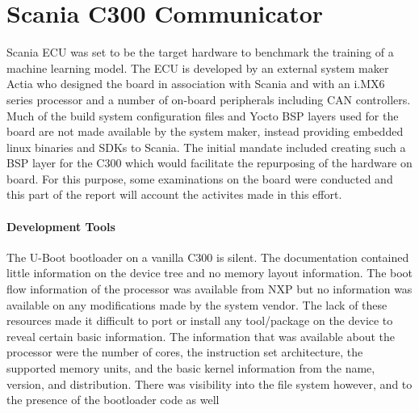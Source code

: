 \chapter{Scania C300 Communicator} \label{rtc-c300}

Scania ECU was set to be the target hardware to benchmark the training of a machine learning model. The ECU is developed by an external system maker Actia who designed the board in association with Scania and with an i.MX6 series processor and a number of on-board peripherals including CAN controllers. Much of the build system configuration files and Yocto BSP layers used for the board are not made available by the system maker, instead providing embedded linux binaries and SDKs to Scania. The initial mandate included creating such a BSP layer for the C300 which would facilitate the repurposing of the hardware on board. For this purpose, some examinations on the board were conducted and this part of the report will account the activites made in this effort.

\subsubsection{Development Tools}

The U-Boot bootloader on a vanilla C300 is silent. The documentation contained little information on the device tree and no memory layout information. The boot flow information of the processor was available from NXP but no information was available on any modifications made by the system vendor. The lack of these resources made it difficult to port or install any tool/package on the device to reveal certain basic information. The information that was available about the processor were the number of cores, the instruction set architecture, the supported memory units, and the basic kernel information from the name, version, and distribution. There was visibility into the file system however, and to the presence of the bootloader code as well



